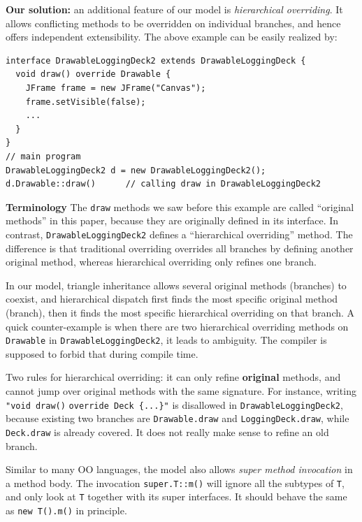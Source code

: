 \noindent\textbf{Our solution:} an additional feature of our model is \textit{hierarchical overriding}. It allows conflicting methods
to be overridden on individual branches, and hence offers independent extensibility. The above example can be easily realized by:
\vspace{3pt}\begin{lstlisting}
interface DrawableLoggingDeck2 extends DrawableLoggingDeck {
  void draw() override Drawable {
    JFrame frame = new JFrame("Canvas");
    frame.setVisible(false);
    ...
  }
}
// main program
DrawableLoggingDeck2 d = new DrawableLoggingDeck2();
d.Drawable::draw()      // calling draw in DrawableLoggingDeck2
\end{lstlisting}\vspace{3pt}
\textbf{Terminology} The \lstinline|draw| methods we saw before this example are called ``original methods'' in this paper, because they are originally defined in its interface.
In contrast, \lstinline|DrawableLoggingDeck2| defines a ``hierarchical overriding'' method. The difference is that traditional overriding overrides all branches by defining another original method, whereas hierarchical overriding only refines one branch.

In our model, triangle inheritance allows several original methods (branches) to coexist, and hierarchical dispatch first finds the most specific original method (branch), then it finds the most specific hierarchical overriding on that branch. A quick counter-example is when there are two hierarchical overriding methods on \lstinline|Drawable| in \lstinline|DrawableLoggingDeck2|, it leads to ambiguity. The compiler is supposed to forbid that during compile time.

Two rules for hierarchical overriding: it can only refine \textbf{original} methods, and cannot jump over original methods with the same signature. For instance, writing \lstinline|"void draw()| \lstinline|override Deck {...}"| is disallowed in \lstinline|DrawableLoggingDeck2|, because existing two branches are \lstinline|Drawable.draw| and \lstinline|LoggingDeck.draw|, while \lstinline|Deck.draw| is already covered. It does not really make sense to refine an old branch.

Similar to many OO languages, the model also allows \textit{super method invocation} in a method body. The invocation \lstinline|super.T::m()| will ignore all the subtypes of \lstinline|T|, and only look at \lstinline|T| together with its super interfaces. It should behave the same as \lstinline|new T().m()| in principle.